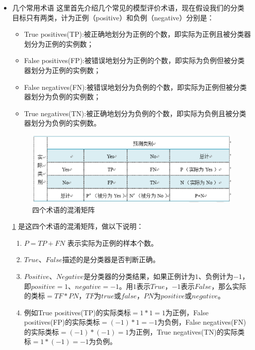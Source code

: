 \begin{itemize}
	\itemsep0em 

\item 几个常用术语
这里首先介绍几个常见的模型评价术语，现在假设我们的分类目标只有两类，计为正例（positive）和负例（negative）分别是：

		\begin{itemize}
	\itemsep0em 
			\item True positives(TP):被正确地划分为正例的个数，即实际为正例且被分类器划分为正例的实例数；
   		\item False positives(FP):被错误地划分为正例的个数，即实际为负例但被分类器划分为正例的实例数；
   		\item False negatives(FN):被错误地划分为负例的个数，即实际为正例但被分类器划分为负例的实例数；
   		\item True negatives(TN):被正确地划分为负例的个数，即实际为负例且被分类器划分为负例的实例数。　
		\end{itemize}

 \begin{figure}[h]
   \centering
   \includegraphics[width=.7\textwidth]{imgs/2.9.1.eps}
   \caption{四个术语的混淆矩阵}
   \label{fig:2.2}
 \end{figure}

		\ref{fig:2.2} 是这四个术语的混淆矩阵，做以下说明：

		\begin{enumerate}
			\itemsep0em 
			\item $P=TP+FN$ 表示实际为正例的样本个数。
			\item $True$、$False$描述的是分类器是否判断正确。
			\item $Positive$、$Negative$是分类器的分类结果，如果正例计为$1$、负例计为$-1$，即$positive=1$、$negative=-1$。用$1$表示$True$，$-1$表示$False$，那么实际的类标$=TF*PN$，$TF$为$true$或$false$，$PN$为$positive$或$negative$。
			\item 例如True positives(TP)的实际类标$=1*1=1$为正例，False positives(FP)的实际类标$=(-1)*1=-1$为负例，False negatives(FN)的实际类标$=(-1)*(-1)=1$为正例，True negatives(TN)的实际类标$=1*(-1)=-1$为负例。
		\end{enumerate}


\end{itemize}
